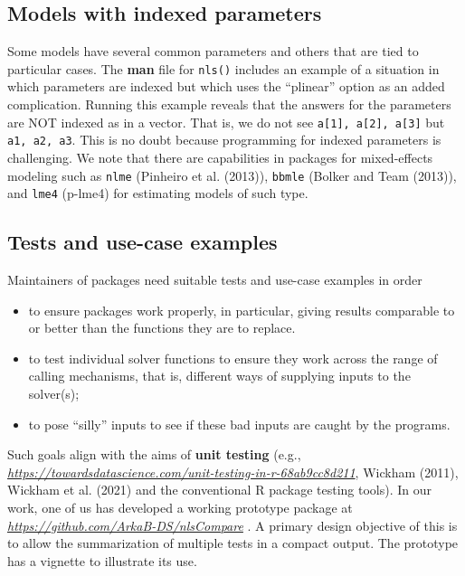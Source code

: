 \hypertarget{models-with-indexed-parameters}{%
\subsection{Models with indexed parameters}\label{models-with-indexed-parameters}}

Some models have several common parameters and
others that are tied to particular cases.
The \textbf{man} file for \texttt{nls()} includes an example of a situation in which
parameters are indexed but which uses the ``plinear'' option as an added complication.
Running this example reveals that the answers for the parameters are NOT indexed
as in a vector.
That is, we do not see \texttt{a{[}1{]},\ a{[}2{]},\ a{[}3{]}} but \texttt{a1,\ a2,\ a3}.
This is no doubt because programming for indexed parameters is challenging.
We note that there are capabilities in packages for mixed-effects modeling
such as \texttt{nlme} (Pinheiro et al. (2013)), \texttt{bbmle} (Bolker and Team (2013)), and \texttt{lme4} (p-lme4) for
estimating models of such type.

\hypertarget{tests-and-use-case-examples}{%
\subsection{Tests and use-case examples}\label{tests-and-use-case-examples}}

Maintainers of packages need suitable tests and use-case examples in order

\begin{itemize}
\tightlist
\item
  to ensure packages work properly, in particular, giving
  results comparable to or better than the functions they are to replace.
\item
  to test individual solver functions to ensure they work across the range of
  calling mechanisms, that is, different ways of supplying inputs to the solver(s);
\item
  to pose ``silly'' inputs to see if these bad inputs are caught by the programs.
\end{itemize}

Such goals align with the aims of \textbf{unit testing}
(e.g., \emph{\url{https://towardsdatascience.com/unit-testing-in-r-68ab9cc8d211}}, Wickham (2011), Wickham et al. (2021)
and the conventional R package testing tools).
In our work, one of us has developed a working prototype package at \emph{\url{https://github.com/ArkaB-DS/nlsCompare}} .
A primary design objective of this is to allow the summarization of multiple tests in
a compact output. The prototype has a vignette to illustrate its use.

